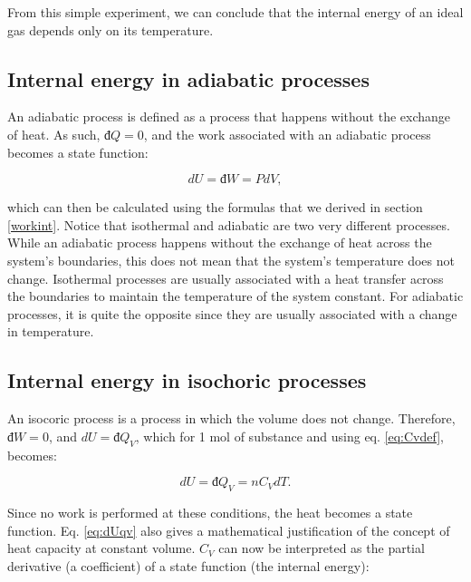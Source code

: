 \documentclass[
  9pt,
]{extbook}
\theoremstyle{definition}
\theoremstyle{definition}
\theoremstyle{definition}
\theoremstyle{remark}
\begin{document}
From this simple experiment, we can conclude that the internal energy of an ideal gas depends only on its temperature.

\hypertarget{internal-energy-in-adiabatic-processes}{%
\subsection{Internal energy in adiabatic processes}\label{internal-energy-in-adiabatic-processes}}

An adiabatic process is defined as a process that happens without the exchange of heat. As such, \(đ Q=0\), and the work associated with an adiabatic process becomes a state function:

\begin{equation}
  dU=đ W=PdV,
  \label{eq:dUadiabatic}
\end{equation}

which can then be calculated using the formulas that we derived in section \ref{workint}. Notice that isothermal and adiabatic are two very different processes. While an adiabatic process happens without the exchange of heat across the system's boundaries, this does not mean that the system's temperature does not change. Isothermal processes are usually associated with a heat transfer across the boundaries to maintain the temperature of the system constant. For adiabatic processes, it is quite the opposite since they are usually associated with a change in temperature.

\hypertarget{internal-energy-in-isochoric-processes}{%
\subsection{Internal energy in isochoric processes}\label{internal-energy-in-isochoric-processes}}

An isocoric process is a process in which the volume does not change. Therefore, \(đ W=0\), and \(dU = đ Q_V\), which for 1 mol of substance and using eq. \eqref{eq:Cvdef}, becomes:

\begin{equation}
  dU = đ Q_V = n C_V dT.
  \label{eq:dUqv}
\end{equation}

Since no work is performed at these conditions, the heat becomes a state function. Eq. \eqref{eq:dUqv} also gives a mathematical justification of the concept of heat capacity at constant volume. \(C_V\) can now be interpreted as the partial derivative (a coefficient) of a state function (the internal energy):
\end{document}
